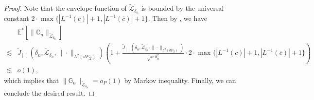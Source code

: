 \documentclass[11pt]{article}
\numberwithin{equation}{section}
\begin{document}
\begin{proof}
	Note that the envelope function of $\widetilde{\mathcal{L}}_{\delta_n}$ is bounded by the universal constant $2\cdot \max\{|L^{-1}(\underline{c})|+1,|L^{-1}(\overline{c})|+1\}$. Then by \citet[Lemma 3.4.2]{van1996weak}, we have
	\begin{align*}
		&\mathbb{E}^*\left[\|\mathbb{G}_n\|_{\widetilde{\mathcal{L}}_{\delta_n}}\right]\\
		\lesssim &\widetilde{J}_{[\ ]}(\delta_n,\widetilde{\mathcal{L}}_{\delta_n},\|\cdot\|_{L^2(dF_{X})})\left(1+\frac{\widetilde{J}_{[\ ]}(\delta_n,\widetilde{\mathcal{L}}_{\delta_n},\|\cdot\|_{L^2(dF_{X})})}{\sqrt{n}\delta_n^2}\cdot 2\cdot \max\{|L^{-1}(\underline{c})|+1,|L^{-1}(\overline{c})|+1\}\right)\\
		\lesssim & o\left(1\right),
	\end{align*}
	which implies that $\|\mathbb{G}_n\|_{\widetilde{\mathcal{L}}_{\delta_n}}=o_P(1)$ by Markov inequality. Finally, we can conclude the desired result.
\end{proof}


\end{document}

